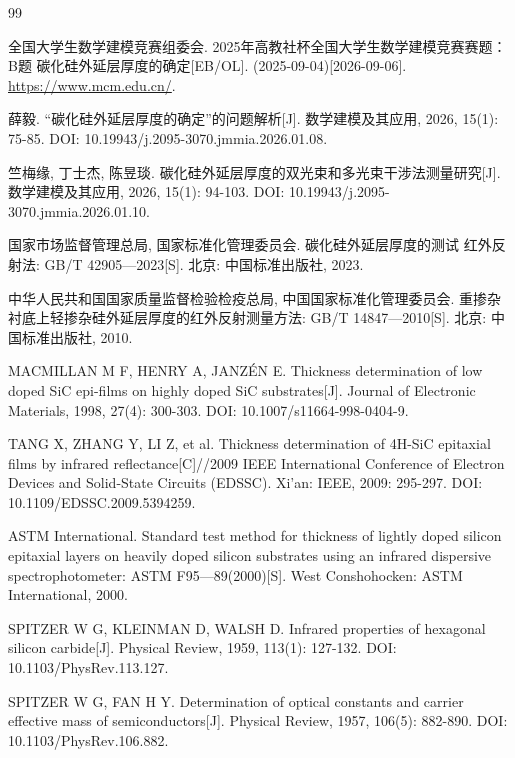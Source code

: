 \documentclass[11pt,a4paper,fontset=fandol]{ctexart}
\begin{document}
\begin{thebibliography}{99}
    \raggedright
    \setlength{\itemsep}{0.15em}
    \small

     全国大学生数学建模竞赛组委会. 2025年高教社杯全国大学生数学建模竞赛赛题：B题 碳化硅外延层厚度的确定[EB/OL]. (2025-09-04)[2026-09-06]. \url{https://www.mcm.edu.cn/}.

     薛毅. “碳化硅外延层厚度的确定”的问题解析[J]. 数学建模及其应用, 2026, 15(1): 75-85. DOI: 10.19943/j.2095-3070.jmmia.2026.01.08.

     竺梅缘, 丁士杰, 陈昱琰. 碳化硅外延层厚度的双光束和多光束干涉法测量研究[J]. 数学建模及其应用, 2026, 15(1): 94-103. DOI: 10.19943/j.2095-3070.jmmia.2026.01.10.

     国家市场监督管理总局, 国家标准化管理委员会. 碳化硅外延层厚度的测试 红外反射法: GB/T 42905—2023[S]. 北京: 中国标准出版社, 2023.

     中华人民共和国国家质量监督检验检疫总局, 中国国家标准化管理委员会. 重掺杂衬底上轻掺杂硅外延层厚度的红外反射测量方法: GB/T 14847—2010[S]. 北京: 中国标准出版社, 2010.

     MACMILLAN M F, HENRY A, JANZÉN E. Thickness determination of low doped SiC epi-films on highly doped SiC substrates[J]. Journal of Electronic Materials, 1998, 27(4): 300-303. DOI: 10.1007/s11664-998-0404-9.

     TANG X, ZHANG Y, LI Z, et al. Thickness determination of 4H-SiC epitaxial films by infrared reflectance[C]//2009 IEEE International Conference of Electron Devices and Solid-State Circuits (EDSSC). Xi'an: IEEE, 2009: 295-297. DOI: 10.1109/EDSSC.2009.5394259.

     ASTM International. Standard test method for thickness of lightly doped silicon epitaxial layers on heavily doped silicon substrates using an infrared dispersive spectrophotometer: ASTM F95—89(2000)[S]. West Conshohocken: ASTM International, 2000.

     SPITZER W G, KLEINMAN D, WALSH D. Infrared properties of hexagonal silicon carbide[J]. Physical Review, 1959, 113(1): 127-132. DOI: 10.1103/PhysRev.113.127.

     SPITZER W G, FAN H Y. Determination of optical constants and carrier effective mass of semiconductors[J]. Physical Review, 1957, 106(5): 882-890. DOI: 10.1103/PhysRev.106.882.


\end{thebibliography}
\end{document}
